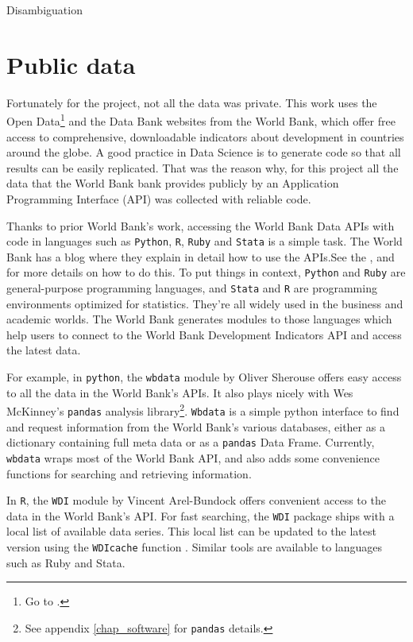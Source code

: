 Disambiguation

\section{Public data}\label{sec_public_data}

Fortunately for the project, not all the data was private. This work uses the Open Data\footnote{Go to \cite{wb_data}.}  and the Data Bank websites from the World Bank, which offer free access to comprehensive, downloadable indicators about development in countries around the globe. A good practice in Data Science is to generate code so that all results can be easily replicated. That was the reason why, for this project all the data that the World Bank bank provides publicly by an Application Programming Interface (API) was collected with reliable code. 

Thanks to prior World Bank's work, accessing the World Bank Data APIs with code in languages such as \texttt{Python}, \texttt{R}, \texttt{Ruby} and \texttt{Stata} is a simple task. The World Bank has a blog where they explain in detail how to use the APIs.See the \cite{wb_api}, \cite{wb_python} and \cite{wb_r} for more details on how to do this. To put things in context, \texttt{Python} and \texttt{Ruby} are general-purpose programming languages, and \texttt{Stata} and \texttt{R} are programming environments optimized for statistics. They're all widely used in the business and academic worlds. The World Bank generates modules to those languages which help users to connect to the World Bank Development Indicators API and access the latest data.

For example, in \texttt{python}, the \texttt{wbdata} module by Oliver Sherouse offers easy access to all the data in the World Bank's APIs. It also plays nicely with Wes McKinney’s  \texttt{pandas} analysis library\footnote{See appendix \ref{chap_software} for \texttt{pandas} details.}. \texttt{Wbdata} is a simple python interface to find and request information from the World Bank's various databases, either as a dictionary containing full meta data or as a \texttt{pandas} Data Frame. Currently, \texttt{wbdata} wraps most of the World Bank API, and also adds some convenience functions for searching and retrieving information.

In \texttt{R}, the \texttt{WDI} module by Vincent Arel-Bundock offers convenient access to the data in the World Bank's API. For fast searching, the \texttt{WDI} package ships with a local list of available data series. This local list can be updated to the latest version using the \texttt{WDIcache} function \parencite{wb_r}. Similar tools are available to languages such as Ruby and Stata.

